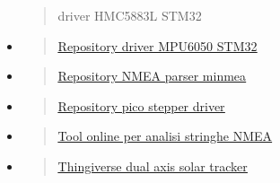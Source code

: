 \begin{itemize}
\begin{quote}
{{  driver HMC5883L STM32}}
  \end{quote}
\item
  \begin{quote}
  \href{https://github.com/Harinadha/STM32_MPU6050lib/blob/master/MPU6050.h}{\underline{Repository
  driver MPU6050 STM32}}
  \end{quote}
\item
  \begin{quote}
  \href{https://github.com/kosma/minmea}{\underline{Repository NMEA
  parser minmea}}
  \end{quote}
\item
  \begin{quote}
  \href{https://github.com/beshrkayali/pico_stepper}{\underline{Repository
  pico stepper driver}}
  \end{quote}
\item
  \begin{quote}
  \href{https://swairlearn.bluecover.pt/nmea_analyser}{\underline{Tool
  online per analisi stringhe NMEA}}
  \end{quote}
\item
  \begin{quote}
  \href{https://www.thingiverse.com/thing:53321}{\underline{Thingiverse
  dual axis solar tracker}}
  \end{quote}
\end{itemize}

